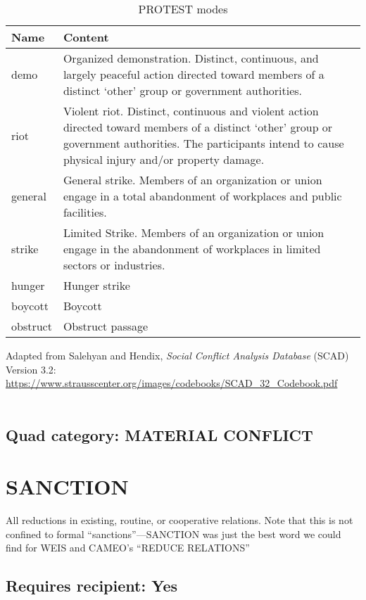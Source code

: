 \documentclass[11pt]{report}
\newcommand{\plcat}[1]{\textsf{#1}}
\begin{document}
\begin{table}[htp]
\caption{PROTEST modes}
\begin{center}
\begin{tabular}{|l|p{13cm}|}
\hline
Name & Content \\
\hline
demo & Organized demonstration. Distinct, continuous, and largely peaceful action directed toward
members of a distinct `other' group or government authorities.  \\
riot & Violent riot. Distinct, continuous and violent action directed toward members of
a distinct `other' group or government authorities. The participants intend to cause physical injury and/or property damage. \\
general & General strike. Members of an organization or union engage in a total abandonment of
workplaces and public facilities.\\
strike & Limited Strike. Members of an organization or union engage in the abandonment of
workplaces in limited sectors or industries.\\
hunger & Hunger strike\\
boycott & Boycott\\
obstruct & Obstruct passage \\
\hline
\end{tabular}
\end{center}
\label{tab:protestmode}
\raggedright{Adapted from Salehyan and Hendix, \textit{Social Conflict Analysis Database} (SCAD)
Version 3.2: \url{https://www.strausscenter.org/images/codebooks/SCAD\_32\_Codebook.pdf}}\\~

\end{table}%
 
\subsection{Quad category: MATERIAL CONFLICT}

\newpage  

\section{SANCTION}

All reductions in existing, routine, or cooperative relations. Note that this is not confined to formal ``sanctions''---\plcat{SANCTION} was just the best word we could find for WEIS and CAMEO's ``REDUCE RELATIONS''


\subsection{Requires recipient: Yes}
\end{document}
